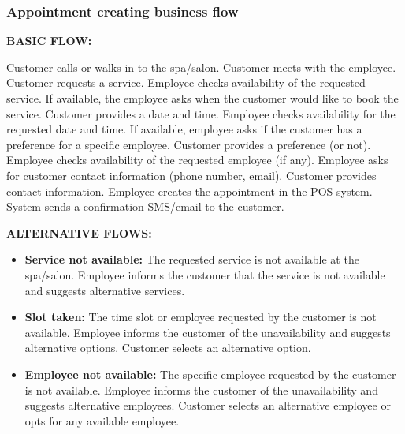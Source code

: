 \documentclass[]{VUMIFTemplateClass}
\begin{document}
\vspace{1cm}


\subsubsection{Appointment creating business flow}

\textbf{BASIC FLOW:}


Customer calls or walks in to the spa/salon.
Customer meets with the employee.
Customer requests a service.
Employee checks availability of the requested service.
If available, the employee asks when the customer would like to book the service.
Customer provides a date and time.
Employee checks availability for the requested date and time.
If available, employee asks if the customer has a preference for a specific employee.
Customer provides a preference (or not).
Employee checks availability of the requested employee (if any).
Employee asks for customer contact information (phone number, email).
Customer provides contact information.
Employee creates the appointment in the POS system.
System sends a confirmation SMS/email to the customer.

\textbf{ALTERNATIVE FLOWS:}
\begin{itemize}
    \item \textbf{Service not available: } The requested service is not available at the spa/salon.
    Employee informs the customer that the service is not available and suggests alternative services.
    \item \textbf{Slot taken: } The time slot or employee requested by the customer is not available.
    Employee informs the customer of the unavailability and suggests alternative options.
    Customer selects an alternative option.
    \item \textbf{Employee not available: } The specific employee requested by the customer is not available.
    Employee informs the customer of the unavailability and suggests alternative employees.
    Customer selects an alternative employee or opts for any available employee.
\end{itemize}
\end{document}
